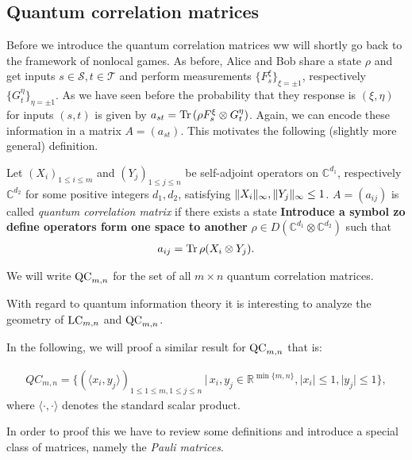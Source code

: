 \subsection{Quantum correlation matrices}
Before we introduce the quantum correlation matrices ww will shortly go back to the framework of nonlocal games. As before, Alice and Bob share a state $ \rho $ and get inputs $ s \in \mathcal{S}, t \in \mathcal{T} $ and perform measurements $ \{ F_s^{\xi} \}_{\xi = \pm 1} $, respectively $ \{ G_t^{\eta} \}_{\eta = \pm 1} $.
As we have seen before the probability that they response is $ (\xi,\eta) $ for inputs $ (s,t) $ is given by 
$ a_{st} = \text{Tr} \, {(\rho F_s^\xi \otimes G_t^\eta )}  $. Again, we can encode these information in a matrix $ A=(a_{st}) $. This motivates the following (slightly more general) definition. 
\begin{dfn}
	Let $ (X_i)_{1 \le i \le m } $ and $ (Y_j)_{1 \le j \le n} $ be self-adjoint operators on $ \mathbb{C}^{d_1} $, respectively $ \mathbb{C}^{d_2} $ for some positive integers $ d_1,d_2 $, satisfying $  \Vert {X_i} \Vert_{\infty},  \Vert {Y_j} \Vert_{\infty} \le 1 $. $ A = (a_{ij}) $ is called {\itshape quantum correlation matrix} if there exists a state \textbf{Introduce a symbol zo define operators form one space to another} $ \rho \in D(\mathbb{C}^{d_1} \otimes \mathbb{C}^{d_2})$ such that 
	\begin{align}\label{QCaij}
	a_{ij} = \text{Tr} \, {\rho (X_i \otimes Y_j)} .
	\end{align}
\end{dfn}
We will write $ \textup{QC}_{m,n} $ for the set of all $ m \times n $ quantum correlation matrices.

With regard to quantum information theory it is interesting to analyze the geometry of $ \textup{LC}_{m,n} $ and $ \textup{QC}_{m,n} $. 


In the following, we will proof a similar result for $ \textup{QC}_{m,n} $ that is: 
\begin{lemma}\label{LemQC}
	\begin{align*}\label{EqQC}
		QC_{m,n} = \{ (\langle x_i,y_j \rangle)_{1 \le 1 \le m, 1 \le j \le n} \,| \, x_i,y_j \in \mathbb{R}^{ \min \{m,n \} }, \vert x_i  \vert \le 1, \vert y_j \vert \le 1  \},
	\end{align*}
	where $ \langle \cdot , \cdot \rangle $ denotes the standard scalar product. 
\end{lemma}
In order to proof this we have to review some definitions and introduce a special class of matrices, namely the {\itshape Pauli matrices}.

